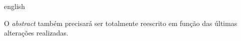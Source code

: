 \documentclass[
	12pt,               %
	openright,          %
	oneside,            %
	a4paper,            %
	english,            %
	brazil              %
	]{abntex2}
\begin{document}
\begin{resumo}[Abstract]
\begin{otherlanguage*}{english}
	


O \emph{abstract} também precisará ser totalmente reescrito em função das últimas alterações realizadas.



\end{otherlanguage*}
\end{resumo}

 

  
\end{document}

